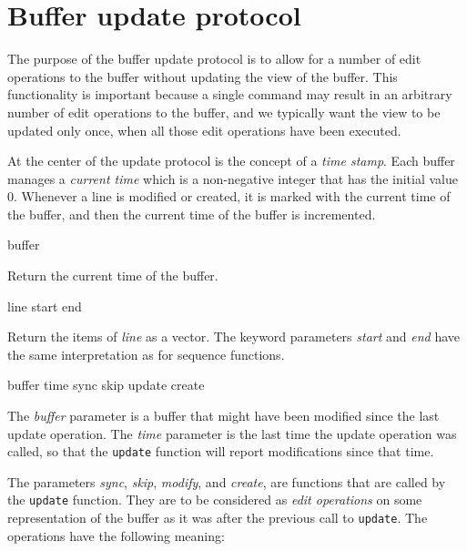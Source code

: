 \section{Buffer update protocol}

The purpose of the buffer update protocol is to allow for a number of
edit operations to the buffer without updating the view of the buffer.
This functionality is important because a single command may result in
an arbitrary number of edit operations to the buffer, and we typically
want the view to be updated only once, when all those edit operations
have been executed.

At the center of the update protocol is the concept of a \emph{time
  stamp}.  Each buffer manages a \emph{current time} which is a
non-negative integer that has the initial value $0$.  Whenever a line
is modified or created, it is marked with the current time of the
buffer, and then the current time of the buffer is incremented.

 {buffer}

Return the current time of the buffer.

 {line \key start end}

Return the items of \textit{line} as a vector.  The keyword parameters
\textit{start} and \textit{end} have the same interpretation as for
\cl{} sequence functions.

 {buffer time sync skip update create}

The \textit{buffer} parameter is a buffer that might have been
modified since the last update operation.  The \textit{time} parameter
is the last time the update operation was called, so that the
\texttt{update} function will report modifications since that time. 

The parameters \textit{sync}, \textit{skip}, \textit{modify}, and
\textit{create}, are functions that are called by the \texttt{update}
function.  They are to be considered as \emph{edit operations} on some
representation of the buffer as it was after the previous call to
\texttt{update}.  The operations have the following meaning:

